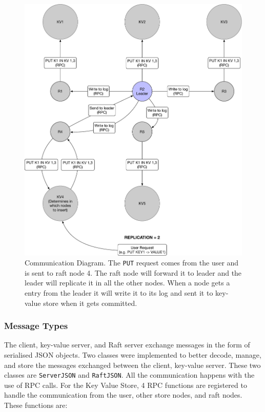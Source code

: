 \documentclass{article}
\begin{document}
\begin{figure}
  \centering
  \includegraphics[width=\textwidth]{communication_diagram.pdf}
  \caption{Communication Diagram. The \texttt{PUT} request comes from the user and is sent to raft node 4.
  The raft node will forward it to leader and the leader will replicate it in all the other nodes. When a
  node gets a entry from the leader it will write it to its log and sent it to key-value store when it
  gets committed.}
  \label{fig:communication}
\end{figure}


\subsubsection{Message Types}
The client, key-value server, and Raft server exchange messages in the form of serialised JSON 
objects. Two classes were implemented to better decode, manage, and store the messages exchanged 
between the client, key-value server. These two classes are \texttt{ServerJSON} 
and \texttt{RaftJSON}. All the communication happens with the use of RPC calls. For the Key Value
Store, 4 RPC functions are registered to handle the communication from the user, other store nodes, 
and raft nodes. These functions are:
\end{document}
